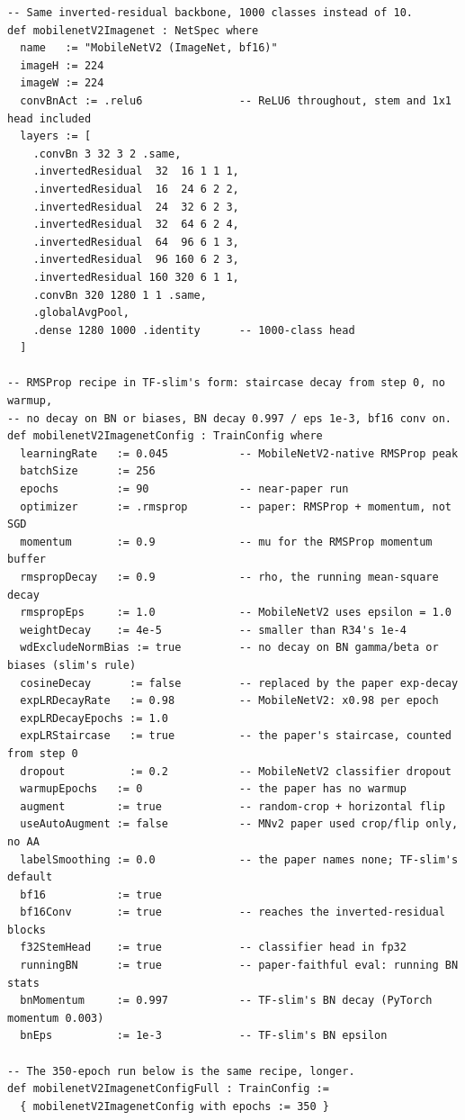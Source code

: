 \begin{verbatim}
-- Same inverted-residual backbone, 1000 classes instead of 10.
def mobilenetV2Imagenet : NetSpec where
  name   := "MobileNetV2 (ImageNet, bf16)"
  imageH := 224
  imageW := 224
  convBnAct := .relu6               -- ReLU6 throughout, stem and 1x1 head included
  layers := [
    .convBn 3 32 3 2 .same,
    .invertedResidual  32  16 1 1 1,
    .invertedResidual  16  24 6 2 2,
    .invertedResidual  24  32 6 2 3,
    .invertedResidual  32  64 6 2 4,
    .invertedResidual  64  96 6 1 3,
    .invertedResidual  96 160 6 2 3,
    .invertedResidual 160 320 6 1 1,
    .convBn 320 1280 1 1 .same,
    .globalAvgPool,
    .dense 1280 1000 .identity      -- 1000-class head
  ]

-- RMSProp recipe in TF-slim's form: staircase decay from step 0, no warmup,
-- no decay on BN or biases, BN decay 0.997 / eps 1e-3, bf16 conv on.
def mobilenetV2ImagenetConfig : TrainConfig where
  learningRate   := 0.045           -- MobileNetV2-native RMSProp peak
  batchSize      := 256
  epochs         := 90              -- near-paper run
  optimizer      := .rmsprop        -- paper: RMSProp + momentum, not SGD
  momentum       := 0.9             -- mu for the RMSProp momentum buffer
  rmspropDecay   := 0.9             -- rho, the running mean-square decay
  rmspropEps     := 1.0             -- MobileNetV2 uses epsilon = 1.0
  weightDecay    := 4e-5            -- smaller than R34's 1e-4
  wdExcludeNormBias := true         -- no decay on BN gamma/beta or biases (slim's rule)
  cosineDecay      := false         -- replaced by the paper exp-decay
  expLRDecayRate   := 0.98          -- MobileNetV2: x0.98 per epoch
  expLRDecayEpochs := 1.0
  expLRStaircase   := true          -- the paper's staircase, counted from step 0
  dropout          := 0.2           -- MobileNetV2 classifier dropout
  warmupEpochs   := 0               -- the paper has no warmup
  augment        := true            -- random-crop + horizontal flip
  useAutoAugment := false           -- MNv2 paper used crop/flip only, no AA
  labelSmoothing := 0.0             -- the paper names none; TF-slim's default
  bf16           := true
  bf16Conv       := true            -- reaches the inverted-residual blocks
  f32StemHead    := true            -- classifier head in fp32
  runningBN      := true            -- paper-faithful eval: running BN stats
  bnMomentum     := 0.997           -- TF-slim's BN decay (PyTorch momentum 0.003)
  bnEps          := 1e-3            -- TF-slim's BN epsilon

-- The 350-epoch run below is the same recipe, longer.
def mobilenetV2ImagenetConfigFull : TrainConfig :=
  { mobilenetV2ImagenetConfig with epochs := 350 }
\end{verbatim}

